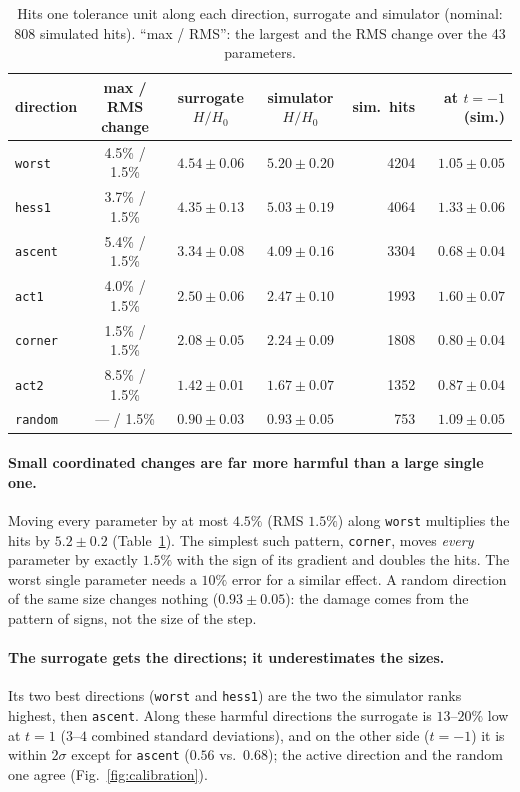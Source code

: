\documentclass[11pt,a4paper]{article}
\newcommand{\HH}{H/H_0}
\begin{document}
\begin{table}[t]
\centering
\caption{Hits one tolerance unit along each direction, surrogate and simulator (nominal: $808$
simulated hits). ``max / RMS'': the largest and the RMS change over the 43 parameters.}
\label{tab:walks}
\begin{tabular}{lcccrr}
\toprule
direction & max / RMS change & surrogate $\HH$ & simulator $\HH$ & sim.\ hits & at $t=-1$ (sim.) \\
\midrule
\texttt{worst}  & 4.5\% / 1.5\% & $4.54\pm0.06$ & $5.20\pm0.20$ & 4204 & $1.05\pm0.05$ \\
\texttt{hess1}  & 3.7\% / 1.5\% & $4.35\pm0.13$ & $5.03\pm0.19$ & 4064 & $1.33\pm0.06$ \\
\texttt{ascent} & 5.4\% / 1.5\% & $3.34\pm0.08$ & $4.09\pm0.16$ & 3304 & $0.68\pm0.04$ \\
\texttt{act1}   & 4.0\% / 1.5\% & $2.50\pm0.06$ & $2.47\pm0.10$ & 1993 & $1.60\pm0.07$ \\
\texttt{corner} & 1.5\% / 1.5\% & $2.08\pm0.05$ & $2.24\pm0.09$ & 1808 & $0.80\pm0.04$ \\
\texttt{act2}   & 8.5\% / 1.5\% & $1.42\pm0.01$ & $1.67\pm0.07$ & 1352 & $0.87\pm0.04$ \\
\texttt{random} & ---  / 1.5\% & $0.90\pm0.03$ & $0.93\pm0.05$ &  753 & $1.09\pm0.05$ \\
\bottomrule
\end{tabular}
\end{table}

\paragraph{Small coordinated changes are far more harmful than a large single one.}
Moving every parameter by at most $4.5\%$ (RMS $1.5\%$) along \texttt{worst} multiplies the hits
by $5.2\pm0.2$ (Table~\ref{tab:walks}). The simplest such pattern, \texttt{corner}, moves
\emph{every} parameter by exactly $1.5\%$ with the sign of its gradient and doubles the hits. The
worst single parameter needs a $10\%$ error for a similar effect. A random direction of the same
size changes nothing ($0.93\pm0.05$): the damage comes from the pattern of signs, not the size of
the step.

\paragraph{The surrogate gets the directions; it underestimates the sizes.}
Its two best directions (\texttt{worst} and \texttt{hess1}) are the two the simulator ranks
highest, then \texttt{ascent}. Along these harmful directions the surrogate is $13$--$20\%$ low at
$t=1$ ($3$--$4$ combined standard deviations), and on the other side ($t=-1$) it is within $2\sigma$
except for \texttt{ascent} ($0.56$ vs.\ $0.68$); the active direction and the random one agree
(Fig.~\ref{fig:calibration}).
\end{document}
